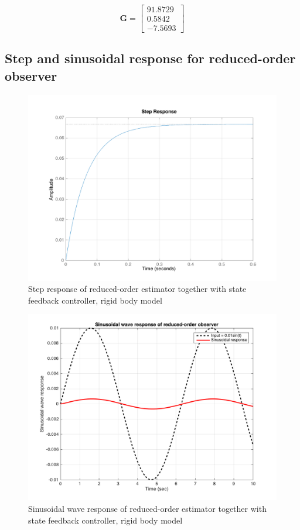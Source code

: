 \documentclass[a4paper, 12pt]{article}
\begin{document}
\begin{equation}\label{ReduG4flexible}
\mathbf{G} = 
\begin{bmatrix}
91.8729	\\	0.5842	\\	-7.5693
\end{bmatrix}
\end{equation}


\subsection{Step and sinusoidal response for reduced-order observer}

\begin{figure}[!htbp]
\centering
\includegraphics[scale = 0.3]{StepResponseReduOrderEst}
\caption{Step response of reduced-order estimator together with state feedback controller, rigid body model}
\label{StepResponseReduOrderEst}
\end{figure}

\begin{figure}[!htbp]
\centering
\includegraphics[scale = 0.3]{SinusoidalResponseReduOrderEst}
\caption{Sinusoidal wave response of reduced-order estimator together with state feedback controller, rigid body model}
\label{SinusoidalResponseReduOrderEst}
\end{figure}
\end{document}
